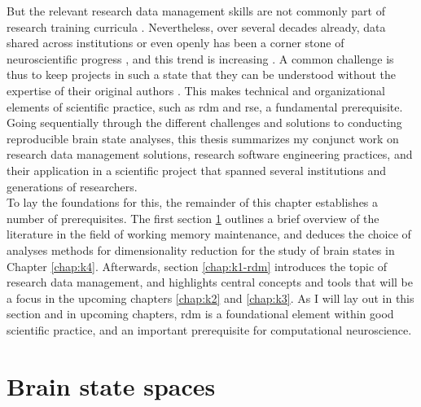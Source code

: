 But the relevant research data management skills are not commonly part of research training curricula \citep{grisham2016proposed}. %
Nevertheless, over several decades already, data shared across institutions or even openly has been a corner stone of neuroscientific progress \citep[e.g.,][]{ferguson2014big, niso2016omega}, and this trend is increasing \citep{gorgolewski2016practical}.
A common challenge is thus to keep projects in such a state that they can be understood without the expertise of their original authors \citep{puce2017review}.
This makes technical and organizational elements of scientific practice, such as \gls{rdm} and \gls{rse}, a fundamental prerequisite.
Going sequentially through the different challenges and solutions to conducting reproducible brain state analyses, this thesis summarizes my conjunct work on research data management solutions, research software engineering practices, and their application in a scientific project that spanned several institutions and generations of researchers.\\
To lay the foundations for this, the remainder of this chapter establishes a number of prerequisites.
The first section \ref{chap:k1-brain} outlines a brief overview of the literature in the field of working memory maintenance, and deduces the choice of analyses methods for dimensionality reduction for the study of brain states in Chapter \ref{chap:k4}.
Afterwards, section \ref{chap:k1-rdm} introduces the topic of research data management, and highlights central concepts and tools that will be a focus in the upcoming chapters \ref{chap:k2} and \ref{chap:k3}.
As I will lay out in this section and in upcoming chapters, \gls{rdm} is a foundational element within good scientific practice, and an important prerequisite for computational neuroscience.

\section{Brain state spaces}
\label{chap:k1-brain}

